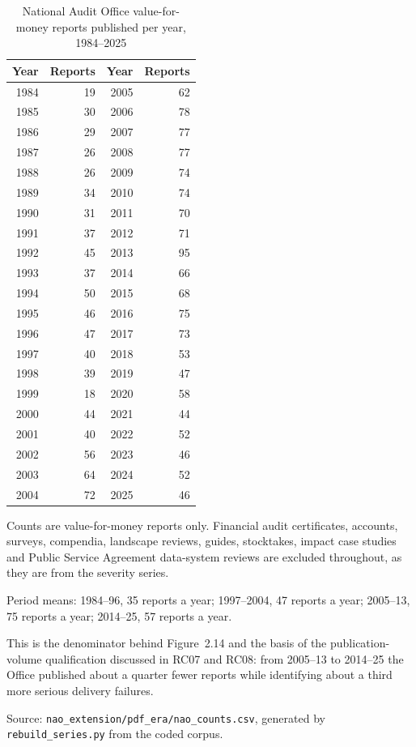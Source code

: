 \begin{table}[htbp]\centering
\begin{threeparttable}
\caption{National Audit Office value-for-money reports published per year, 1984--2025}
\begin{tabular}{rr@{\hskip 2em}rr}
\toprule
Year & Reports & Year & Reports \\
\midrule
1984 & 19 & 2005 & 62 \\
1985 & 30 & 2006 & 78 \\
1986 & 29 & 2007 & 77 \\
1987 & 26 & 2008 & 77 \\
1988 & 26 & 2009 & 74 \\
1989 & 34 & 2010 & 74 \\
1990 & 31 & 2011 & 70 \\
1991 & 37 & 2012 & 71 \\
1992 & 45 & 2013 & 95 \\
1993 & 37 & 2014 & 66 \\
1994 & 50 & 2015 & 68 \\
1995 & 46 & 2016 & 75 \\
1996 & 47 & 2017 & 73 \\
1997 & 40 & 2018 & 53 \\
1998 & 39 & 2019 & 47 \\
1999 & 18 & 2020 & 58 \\
2000 & 44 & 2021 & 44 \\
2001 & 40 & 2022 & 52 \\
2002 & 56 & 2023 & 46 \\
2003 & 64 & 2024 & 52 \\
2004 & 72 & 2025 & 46 \\
\bottomrule
\end{tabular}
\begin{tablenotes}[flushleft]\footnotesize
\item Counts are value-for-money reports only. Financial audit certificates, accounts, surveys,
compendia, landscape reviews, guides, stocktakes, impact case studies and Public Service
Agreement data-system reviews are excluded throughout, as they are from the severity series.
\item Period means: 1984--96, 35 reports a year; 1997--2004, 47 reports a year; 2005--13, 75 reports a year; 2014--25, 57 reports a year.
\item This is the denominator behind Figure~2.14 and the basis of the publication-volume
qualification discussed in RC07 and RC08: from 2005--13 to 2014--25 the Office published about a
quarter fewer reports while identifying about a third more serious delivery failures.
\item Source: \texttt{nao\_extension/pdf\_era/nao\_counts.csv}, generated by
\texttt{rebuild\_series.py} from the coded corpus.
\end{tablenotes}
\end{threeparttable}
\label{tab:ch02naooutput}
\end{table}
